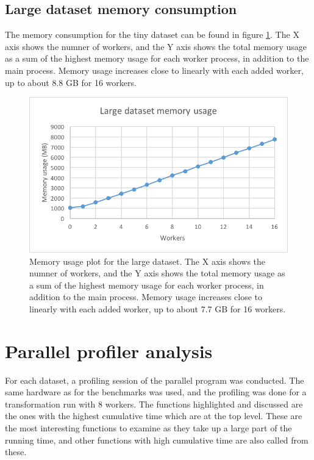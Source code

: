 \subsection{Large dataset memory consumption}
The memory consumption for the tiny dataset can be found in figure \ref{fig:dataset_4_memory}.
The X axis shows the numner of workers, and the Y axis shows the total memory usage as
a sum of the highest memory usage for each worker process, in addition to the main process. Memory usage increases close to linearly with each added worker,
up to about 8.8 GB for 16 workers.
\begin{figure}[ht]
  \centering
  \includegraphics[width=120mm]{figures/dataset_4/dataset_4_memory.png}
  \caption[Memory usage plot for the large dataset.]{Memory usage plot for the large dataset. The X axis shows the numner of workers, and the Y axis shows the total memory usage as
  a sum of the highest memory usage for each worker process, in addition to the main process. Memory usage increases close to linearly with each added worker,
  up to about 7.7 GB for 16 workers.}
  \label{fig:dataset_4_memory}
\end{figure}

\section{Parallel profiler analysis}
For each dataset, a profiling session of the parallel program was conducted. The same hardware as for the benchmarks was used, and
the profiling was done for a transformation run with 8 workers. The functions highlighted and discussed are the ones with the highest
cumulative time which are at the top level. These are the most interesting functions to examine as they take up a large part of the
running time, and other functions with high cumulative time are also called from these.

